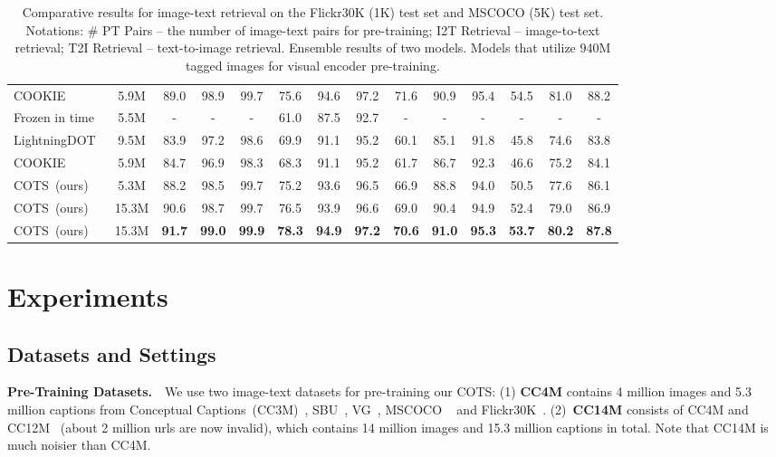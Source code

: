 \documentclass[10pt,twocolumn,letterpaper]{article}
\begin{document}
\begin{table*}[t]
{\begin{tabular}{lccccccccccccc}
{\color{gray}COOKIE~\cite{wen2021cookie}} & {\color{gray}5.9M} &{\color{gray}89.0} & {\color{gray}98.9} & {\color{gray}99.7} & {\color{gray}75.6} & {\color{gray}94.6} & {\color{gray}97.2} & {\color{gray}71.6} & {\color{gray}90.9} & {\color{gray}95.4} & {\color{gray}54.5} & {\color{gray}81.0} & {\color{gray}88.2} \\
    Frozen in time~\cite{bain2021frozen} & 5.5M & - & - & - & 61.0 & 87.5 & 92.7 & - & - & - &  - & - & - \\
    LightningDOT~\cite{sun2021lightningdot} & 9.5M & 83.9 & 97.2 & 98.6 & 69.9 & 91.1 & 95.2 & 60.1 & 85.1 & 91.8 &  45.8 & 74.6 & 83.8\\
    COOKIE~\cite{wen2021cookie} & 5.9M  &84.7 & 96.9 & 98.3 & 68.3 & 91.1 & 95.2 & 61.7 & 86.7 & 92.3 & 46.6 & 75.2 & 84.1 \\
COTS~(ours) & 5.3M  & 88.2 & 98.5 & 99.7 & 75.2 & 93.6 & 96.5 & 66.9 & 88.8 & 94.0 &  50.5 & 77.6 & 86.1 \\
    COTS~(ours) & 15.3M & 90.6 & 98.7 & 99.7 & 76.5 & 93.9 & 96.6  & 69.0 & 90.4 & 94.9 & 52.4 & 79.0 & 86.9 \\ 
    COTS~(ours) & 15.3M  & \bf91.7 & \bf99.0 & \bf99.9 & \bf78.3 & \bf94.9 & \bf97.2  & \bf70.6 & \bf91.0 & \bf95.3 & \bf53.7 & \bf80.2 & \bf87.8 \\ 
    \bottomrule
    \end{tabular}}
    \vspace{-0.1in}
    \caption{Comparative results for image-text retrieval on the Flickr30K (1K) test set and MSCOCO (5K) test set. Notations: \# PT Pairs -- the number of image-text pairs for pre-training; I2T Retrieval -- image-to-text retrieval; T2I Retrieval -- text-to-image retrieval.  Ensemble results of two models.  Models that utilize {\color{gray}940M tagged images} for visual encoder pre-training. 
    }  
    \label{tab:image_sota}
    \vspace{-0.1in}
\end{table*}


\section{Experiments}

\subsection{Datasets and Settings}

\noindent\textbf{Pre-Training Datasets.}~~We use two image-text datasets for pre-training our COTS: (1) \textbf{CC4M} contains 4 million images and 5.3 million captions from Conceptual Captions~(CC3M)~\cite{sharma2018conceptual}, SBU~\cite{ordonez2011im2text}, VG~\cite{krishna2017visual}, MSCOCO ~\cite{lin2014microsoft} and Flickr30K~\cite{plummer2015flickr30k}. (2)~\textbf{CC14M} consists of CC4M and CC12M~\cite{changpinyo2021conceptual} (about 2 million urls are now invalid), which contains 14 million images and 15.3 million captions in total. Note that CC14M is much noisier than CC4M.
\end{document}
